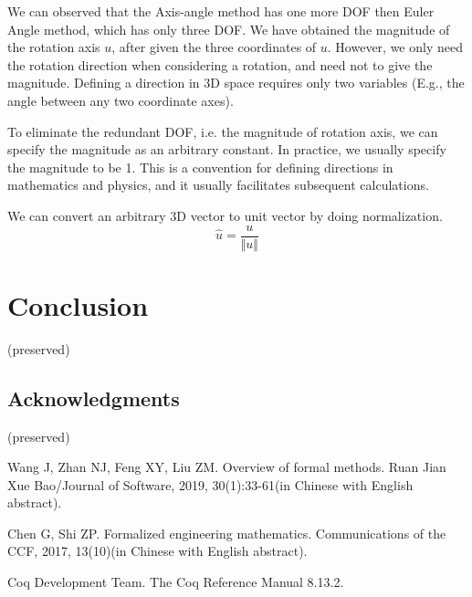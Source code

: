 \documentclass[runningheads]{llncs}
\newcommand{\Clen}[1]{\Vert #1\Vert}
\begin{document}
We can observed that the Axis-angle method has one more DOF then Euler Angle method, which has only three DOF.
We have obtained the magnitude of the rotation axis $u$, after given the three coordinates of $u$.
However, we only need the rotation direction when considering a rotation, and need not to give the magnitude.
Defining a direction in 3D space requires only two variables (E.g., the angle between any two coordinate axes).

To eliminate the redundant DOF, i.e. the magnitude of rotation axis, we can specify the magnitude as an arbitrary constant.
In practice, we usually specify the magnitude to be 1.
This is a convention for defining directions in mathematics and physics, and it usually facilitates subsequent calculations.

We can convert an arbitrary 3D vector to unit vector by doing normalization.
\begin{equation}
  \hat{u}=\frac{u}{\Clen{u}}
\end{equation}




\section{Conclusion}\label{conclusion}
  (preserved)

\subsection*{Acknowledgments}
  (preserved)

%
%
%
% 
% 
%
\begin{thebibliography}{99}

Wang J, Zhan NJ, Feng XY, Liu ZM. Overview of formal methods. Ruan Jian Xue Bao/Journal of Software, 2019, 30(1):33-61(in Chinese with English abstract). 

Chen G, Shi ZP. Formalized engineering mathematics. Communications of the CCF, 2017, 13(10)(in Chinese with English abstract).

Coq Development Team. The Coq Reference Manual 8.13.2.

\end{thebibliography}
\end{document}
